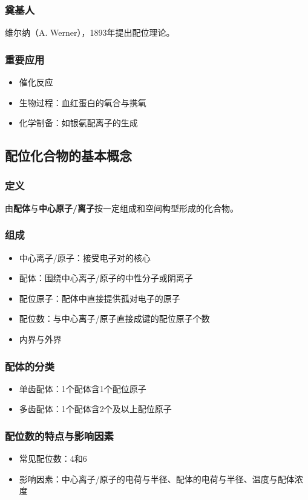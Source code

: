 \subsubsection{奠基人}
维尔纳（A. Werner），1893年提出配位理论。

\subsubsection{重要应用}
\begin{itemize}
    \item 催化反应
    \item 生物过程：血红蛋白的氧合与携氧
    \item 化学制备：如银氨配离子的生成
\end{itemize}

\subsection{配位化合物的基本概念}
\subsubsection{定义}
由\textbf{配体}与\textbf{中心原子/离子}按一定组成和空间构型形成的化合物。

\subsubsection{组成}
\begin{itemize}
    \item 中心离子/原子：接受电子对的核心
    \item 配体：围绕中心离子/原子的中性分子或阴离子
    \item 配位原子：配体中直接提供孤对电子的原子
    \item 配位数：与中心离子/原子直接成键的配位原子个数
    \item 内界与外界
\end{itemize}

\subsubsection{配体的分类}
\begin{itemize}
    \item 单齿配体：1个配体含1个配位原子
    \item 多齿配体：1个配体含2个及以上配位原子
\end{itemize}

\subsubsection{配位数的特点与影响因素}
\begin{itemize}
    \item 常见配位数：4和6
    \item 影响因素：中心离子/原子的电荷与半径、配体的电荷与半径、温度与配体浓度
\end{itemize}

